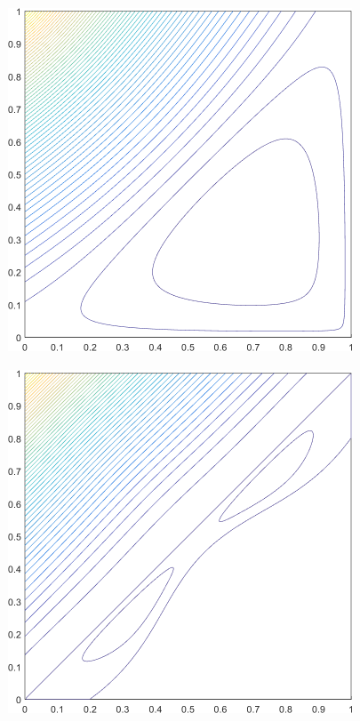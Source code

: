 \begin{figure}
\begin{subfigure}[b]{0.39\textwidth}
		\caption{}
	\end{subfigure}
	\vfill
	\begin{subfigure}[b]{0.39\textwidth}
		\centering
		\includegraphics[width=\textwidth]{figures/sec_BF/square_MV2_contour_b4.png}
		\caption{}
	\end{subfigure}
	\hspace{1.5cm}
	\begin{subfigure}[b]{0.39\textwidth}
		\centering
		\includegraphics[width=\textwidth]{figures/sec_BF/square_MAXENT2_contour_b4.png}

\end{subfigure}
\end{figure}
